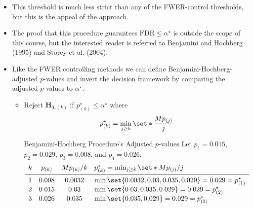 \begin{itemize}
\begin{figure}[!htbp]
                  \texttt{[image: pvsrank2.pdf]}
                  \caption{Significance thresholds for several methods of correction.}\label{fig:pvsrank2}
            \end{figure}
            \begin{Example}{Four-test Example --- Benjamini-Hochberg Procedure}{}
                  Let $ p_1=0.015 $, $ p_2=0.029 $, $ p_3=0.008 $, and $ p_4=0.026 $. Suppose that we wish to ensure
                  $ \FWER\le \alpha^\star=0.05 $. Since all $ p $-values fall below the purple line in~,
                  we reject all four null hypotheses.
            \end{Example}
      \item This threshold is much less strict than any of the FWER-control thresholds, but this is the appeal of
            the approach.
      \item The proof that this procedure guarantees $ \text{FDR}\le \alpha^\star $ is outside the scope of this course, but the
            interested reader is referred to Benjamini and Hochberg (1995) and Storey et al. (2004).
      \item Like the FWER controlling methods we can define Benjamini-Hochberg-adjusted $p$-values and invert
            the decision framework by comparing the adjusted $ p $-values to $ \alpha^\star $.
            \begin{itemize}
                  \item Reject $ \mathbf{H}_{0,(k)} $ if $ p_{(k)}^\star\le \alpha^\star $ where
                        \[ p_{(k)}^\star=\min_{j\ge k}\set*{\frac{Mp_{(j)}}{j}} \]
                        \begin{Example}{Benjamini-Hochberg Procedure's Adjusted $ p $-values}{}
                              Let $ p_1=0.015 $, $ p_2=0.029 $, $ p_3=0.008 $, and $ p_4=0.026 $.
                              \[ \begin{array}{cccl}
                                          k & p_{(k)} & M p_{(k)}/k & p_{(k)}^\star=\min_{j\ge k}\set*{Mp_{(j)}/j}          \\
                                          \midrule
                                          1 & 0.008   & 0.0032      & \min\set{0.0032,0.03,0.035,0.029}=0.029=p_{(1)}^\star \\
                                          2 & 0.015   & 0.03        & \min\set{0.03,0.035,0.029}=0.029=p_{(2)}^\star        \\
                                          3 & 0.026   & 0.035       & \min\set{0.035,0.029}=0.029=p_{(3)}^\star             \\

\end{array}\]
\end{Example}
\end{itemize}
\end{itemize}
